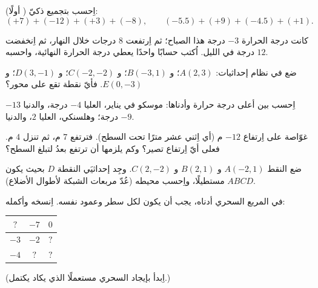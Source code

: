 \begin{exercise}[$\star$]\label{exo:g7:negatives:6}
اِحسب بتجميع ذكيّ ( أولًا):
\[
(+7) + (-12) + (+3) + (-8), \qquad
(-5.5) + (+9) + (-4.5) + (+1).
\]
\end{exercise}

\begin{exercise}[$\star$]\label{exo:g7:negatives:7}
كانت درجة الحرارة $-3$ درجة هذا الصباح؛ ثم اِرتفعت $8$ درجات
خلال النهار، ثم اِنخفضت $12$ درجة في الليل. اُكتب حسابًا
واحدًا يعطي درجة الحرارة النهائية، واحسبه.
\end{exercise}

\begin{exercise}[$\star$]\label{exo:g7:negatives:8}
ضع في نظام إحداثيات: $A(2, 3)$؛ و $B(-3, 1)$؛ و $C(-2, -2)$؛
و $D(3, -1)$؛ و $E(0, -3)$. فأيّ نقطة تقع على محور؟
\end{exercise}

\begin{exercise}[$\star\star$]\label{exo:g7:negatives:9}
اِحسب  بين أعلى درجة حرارة وأدناها:
موسكو في يناير، العليا $-4$ درجة، والدنيا $-13$ درجة؛ وهلسنكي، العليا
$2$، والدنيا $-9$.
\end{exercise}

\begin{exercise}[$\star\star$]\label{exo:g7:negatives:10}
غوّاصة على اِرتفاع $-12$ م (أي اِثني عشر مترًا تحت السطح). فترتفع
$7$ م، ثم تنزل $4$ م. فعلى أيّ اِرتفاع تصير؟ وكم يلزمها
أن ترتفع بعدُ لتبلغ السطح؟
\end{exercise}

\begin{exercise}[$\star\star$]\label{exo:g7:negatives:11}
ضع النقط $A(-2, 1)$ و $B(2, 1)$ و $C(2, -2)$. وجِد إحداثيَي
النقطة $D$ بحيث يكون $ABCD$ مستطيلًا، واِحسب محيطه
(عُدّ مربعات الشبكة لأطوال الأضلاع).
\end{exercise}

\begin{exercise}[$\star\star\star$]\label{exo:g7:negatives:12}
في المربع السحري أدناه، يجب أن يكون لكل سطر وعمود 
 نفسه. اِنسخه وأكمله:
\begin{center}
\renewcommand{\arraystretch}{1.4}
\begin{tabular}{|c|c|c|}
\hline
$?$ & $-7$ & $0$ \\
\hline
$-3$ & $-2$ & $?$ \\
\hline
$-4$ & $?$ & $?$ \\
\hline
\end{tabular}
\end{center}
(اِبدأ بإيجاد  السحري مستعملًا  الذي يكاد
يكتمل.)
\end{exercise}


